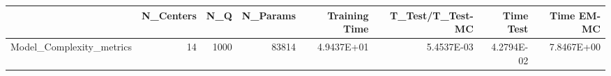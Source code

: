 \begin{tabular}{lrrrrrrr}
\toprule
{} &  N\_Centers &   N\_Q &  N\_Params &  Training Time &  T\_Test/T\_Test-MC &  Time Test &  Time EM-MC \\
\midrule
Model\_Complexity\_metrics &         14 &  1000 &     83814 &     4.9437E+01 &        5.4537E-03 & 4.2794E-02 &  7.8467E+00 \\
\bottomrule
\end{tabular}
